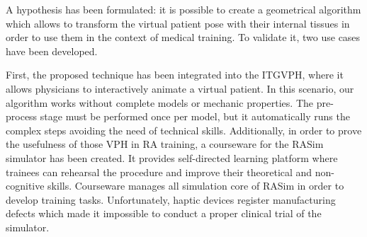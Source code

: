 A hypothesis has been formulated: it is possible to create a geometrical algorithm which allows to transform the virtual patient pose with their internal tissues in order to use them in the context of medical training. To validate it, two use cases have been developed.


First, the proposed technique has been integrated into the ITGVPH, where it allows physicians to interactively animate a virtual patient. In this scenario, our algorithm works without complete models or mechanic properties. The pre-process stage must be performed once per model, but it automatically runs the complex steps avoiding the need of technical skills. Additionally, in order to prove the usefulness of those VPH in RA training, a courseware for the RASim simulator has been created. It provides self-directed learning platform where trainees can rehearsal the procedure and improve their theoretical and non-cognitive skills. Courseware manages all simulation core of RASim in order to develop training tasks. Unfortunately, haptic devices register manufacturing defects which made it impossible to conduct a proper clinical trial of the simulator.

